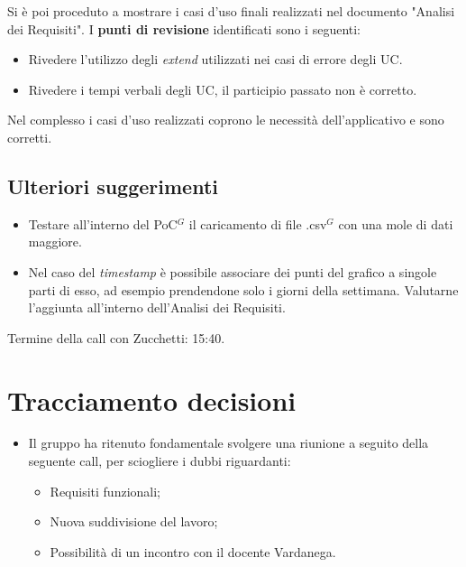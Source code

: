 \noindent
Si è poi proceduto a mostrare i casi d'uso finali realizzati nel documento "Analisi dei Requisiti".
I \textbf{punti di revisione} identificati sono i seguenti:
\begin{itemize}
	\item Rivedere l'utilizzo degli \textit{extend} utilizzati nei casi di errore degli UC.
	\item Rivedere i tempi verbali degli UC, il participio passato non è corretto.
\end{itemize}
Nel complesso i casi d'uso realizzati coprono le necessità dell'applicativo e sono corretti.

\subsection{Ulteriori suggerimenti}
\begin{itemize}
	\item Testare all'interno del PoC$^{G}$ il caricamento di file .csv$^{G}$ con una mole di dati maggiore.
	\item Nel caso del \textit{timestamp} è possibile associare dei punti del grafico a singole parti di esso, ad esempio prendendone solo i giorni della settimana. Valutarne l'aggiunta all'interno dell'Analisi dei Requisiti.
\end{itemize}

\noindent Termine della call con Zucchetti: 15:40.



\section{Tracciamento decisioni}
\begin{itemize}
	\item Il gruppo ha ritenuto fondamentale svolgere una riunione a seguito della seguente call, per sciogliere i dubbi riguardanti: 
	\begin{itemize}
		\item Requisiti funzionali;
		\item Nuova suddivisione del lavoro;
		\item Possibilità di un incontro con il docente Vardanega.
	\end{itemize}
\end{itemize}
